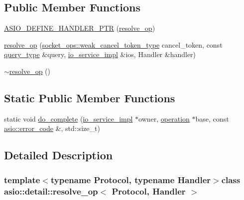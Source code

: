 \subsection*{Public Member Functions}
\begin{DoxyCompactItemize}
\item 
\hyperlink{classasio_1_1detail_1_1resolve__op_a8a8c9a67358fd64be9a13ab89766597a}{A\+S\+I\+O\+\_\+\+D\+E\+F\+I\+N\+E\+\_\+\+H\+A\+N\+D\+L\+E\+R\+\_\+\+P\+T\+R} (\hyperlink{classasio_1_1detail_1_1resolve__op}{resolve\+\_\+op})
\item 
\hyperlink{classasio_1_1detail_1_1resolve__op_a3d173ce305083f6b89addb2d4e599ed0}{resolve\+\_\+op} (\hyperlink{namespaceasio_1_1detail_1_1socket__ops_a9dbe5bfa22a69dc9a583a8060228860f}{socket\+\_\+ops\+::weak\+\_\+cancel\+\_\+token\+\_\+type} cancel\+\_\+token, const \hyperlink{classasio_1_1detail_1_1resolve__op_a53f417f33afa9bc3982e7d951593ca65}{query\+\_\+type} \&query, \hyperlink{namespaceasio_1_1detail_a6d61d9b8e53c11288be549d82aec5a42}{io\+\_\+service\+\_\+impl} \&ios, Handler \&handler)
\item 
\hyperlink{classasio_1_1detail_1_1resolve__op_a5da350453c8951e522ae545793ab436d}{$\sim$resolve\+\_\+op} ()
\end{DoxyCompactItemize}
\subsection*{Static Public Member Functions}
\begin{DoxyCompactItemize}
\item 
static void \hyperlink{classasio_1_1detail_1_1resolve__op_a9a1feff6a9b2324010e5edd009998ba9}{do\+\_\+complete} (\hyperlink{namespaceasio_1_1detail_a6d61d9b8e53c11288be549d82aec5a42}{io\+\_\+service\+\_\+impl} $\ast$owner, \hyperlink{namespaceasio_1_1detail_a338968609bec20e37145309f8f9ec936}{operation} $\ast$base, const \hyperlink{classasio_1_1error__code}{asio\+::error\+\_\+code} \&, std\+::size\+\_\+t)
\end{DoxyCompactItemize}


\subsection{Detailed Description}
\subsubsection*{template$<$typename Protocol, typename Handler$>$class asio\+::detail\+::resolve\+\_\+op$<$ Protocol, Handler $>$}



